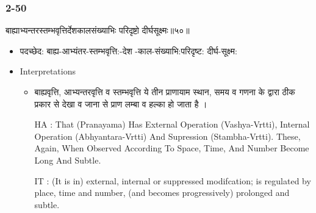 \begin{frame}[fragile]\frametitle{2-50}
\begin{sanskrit}
बाह्याभ्यन्तरस्तम्भवृत्तिर्देशकालसंख्याभिः परिदृष्टो दीर्घसूक्ष्मः॥५०॥
\end{sanskrit}

	\begin{itemize}
	\item पदच्छेद: बाह्य-आभ्यंतर-स्तम्भवृत्ति:-देश -काल-संख्याभि:परिदृष्ट: दीर्घ-सूक्ष्म:
	\item Interpretations
		\begin{itemize}
		\item बाह्यवृत्ति, आभ्यन्तरवृत्ति व स्तम्भवृत्ति ये तीन प्राणायाम स्थान, समय व गणना के द्वारा ठीक प्रकार से देखा व जाना से प्राण लम्बा व हल्का हो जाता है ।
		\item [HA]: That (Pranayama) Has External Operation (Vashya-Vrtti), Internal Operation (Abhyantara-Vrtti) And Supression (Stambha-Vrtti). These, Again, When Observed According To Space, Time, And Number Become Long And Subtle.
		\item [IT]: (It is in) external, internal or suppressed modifcation; is regulated by place, time and number, (and becomes progressively) prolonged and subtle.

		\end{itemize}
	\end{itemize}	
\end{frame}

